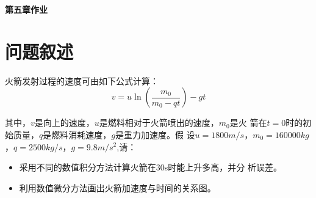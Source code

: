 \documentclass[a4paper,12pt]{ctexart}
\begin{document}
\centerline{\Large{\textbf{第五章作业}}}
\section{问题叙述}
\par
火箭发射过程的速度可由如下公式计算：
\begin{equation}
    v=u\ln{(\frac{m_0}{m_0-qt})}-gt
\end{equation}
\par
其中，$v$是向上的速度，$u$是燃料相对于火箭喷出的速度，$m_0$是火
箭在$t=0$时的初始质量，$q$是燃料消耗速度，$g$是重力加速度。假
设$u=1800m/s$，$m_0=160000kg$，$q=2500kg/s$，$g=9.8m/s^2$,请：
\begin{itemize}
    \item 采用不同的数值积分方法计算火箭在30s时能上升多高，并分
          析误差。
    \item 利用数值微分方法画出火箭加速度与时间的关系图。
\end{itemize}
\end{document}
